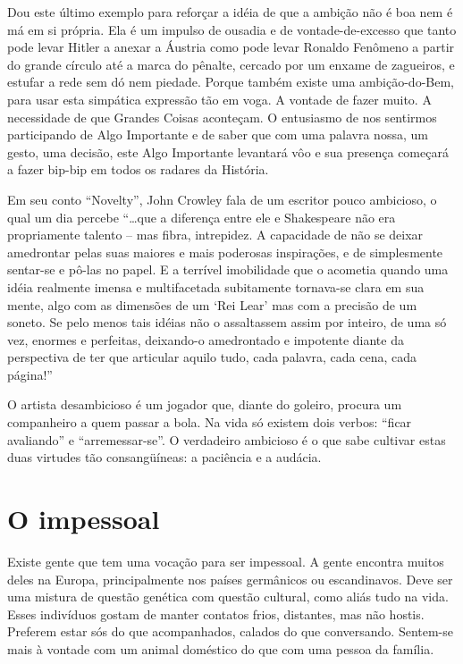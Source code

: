 Dou este último exemplo para reforçar a idéia de que a ambição não é
boa nem é má em si própria. Ela é um impulso de ousadia e de
vontade-de-excesso que tanto pode levar Hitler a anexar a Áustria
como pode levar Ronaldo Fenômeno a partir do grande círculo até a
marca do pênalte, cercado por um enxame de zagueiros, e estufar a
rede sem dó nem piedade. Porque também existe uma ambição-do-Bem,
para usar esta simpática expressão tão em voga. A vontade de fazer
muito. A necessidade de que Grandes Coisas aconteçam. O entusiasmo de
nos sentirmos participando de Algo Importante e de saber que com uma
palavra nossa, um gesto, uma decisão, este Algo Importante levantará
vôo e sua presença começará a fazer bip-bip em todos os radares da
História.

Em seu conto “Novelty”, John Crowley fala de um escritor pouco
ambicioso, o qual um dia percebe “…que a diferença entre ele e
Shakespeare não era propriamente talento -- mas fibra, intrepidez. A
capacidade de não se deixar amedrontar pelas suas maiores e mais
poderosas inspirações, e de simplesmente sentar-se e pô-las no papel.
E a terrível imobilidade que o acometia quando uma idéia realmente
imensa e multifacetada subitamente tornava-se clara em sua mente,
algo com as dimensões de um ‘Rei Lear’ mas com a precisão de um
soneto. Se pelo menos tais idéias não o assaltassem assim por
inteiro, de uma só vez, enormes e perfeitas, deixando-o amedrontado e
impotente diante da perspectiva de ter que articular aquilo tudo,
cada palavra, cada cena, cada página!”

O artista desambicioso é um jogador que, diante do goleiro, procura um
companheiro a quem passar a bola. Na vida só existem dois verbos:
“ficar avaliando” e “arremessar-se”. O verdadeiro ambicioso é o que
sabe cultivar estas duas virtudes tão consangüíneas: a paciência e a
audácia.

\chapter{O impessoal}

Existe gente que tem uma vocação para ser impessoal. A gente encontra
muitos deles na Europa, principalmente nos países germânicos ou
escandinavos. Deve ser uma mistura de questão genética com questão
cultural, como aliás tudo na vida. Esses indivíduos gostam de manter
contatos frios, distantes, mas não hostis. Preferem estar sós do que
acompanhados, calados do que conversando. Sentem-se mais à vontade
com um animal doméstico do que com uma pessoa da família. 

